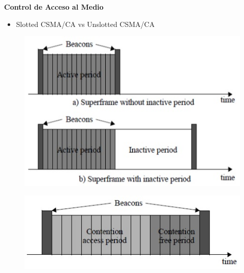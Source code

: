 \documentclass[aspectratio=169]{beamer}
\begin{document}
\begin{frame}{\textbf{Control de Acceso al Medio}}
\begin{minipage}[c]{1.0\linewidth}
	\begin{minipage}[c]{0.6\linewidth}
		\begin{itemize}
			\item Slotted CSMA/CA vs Unslotted CSMA/CA
			\vspace{10px}
	  	\end{itemize}	
	\end{minipage}
	\begin{minipage}[c]{0.35\linewidth}
		\begin{figure}[H]
			\includegraphics[width=1\textwidth]{./imagenes/superframe.jpg}
		\end{figure}
		\begin{figure}[H]
			\includegraphics[width=1\textwidth]{./imagenes/unsolotted.jpg}
		\end{figure}		  	  	
	\end{minipage}
\end{minipage}
\end{frame}
\end{document}
